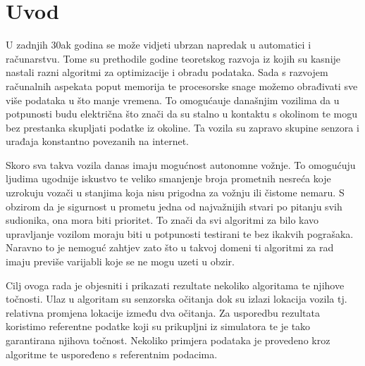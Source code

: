 \chapter{Uvod}

U zadnjih 30ak godina se može vidjeti ubrzan napredak u automatici i računarstvu. Tome su prethodile godine teoretskog razvoja iz kojih su kasnije nastali razni algoritmi za optimizacije i obradu podataka. Sada s razvojem računalnih aspekata poput memorija te procesorske snage možemo obrađivati sve više podataka u što manje vremena. To omogućauje današnjim vozilima da u potpunosti budu električna što znači da su stalno u kontaktu s okolinom te mogu bez prestanka skupljati podatke iz okoline. Ta vozila su zapravo skupine senzora i urađaja konstantno povezanih na internet.

Skoro sva takva vozila danas imaju mogućnost autonomne vožnje. To omogućuju ljudima ugodnije iskustvo te veliko smanjenje broja prometnih nesreća koje uzrokuju vozači u stanjima koja nisu prigodna za vožnju ili čistome nemaru. S obzirom da je sigurnost u prometu jedna od najvažnijih stvari po pitanju svih sudionika, ona mora biti prioritet. To znači da svi algoritmi za bilo kavo upravljanje vozilom moraju biti u potpunosti testirani te bez ikakvih pograšaka. Naravno to je nemoguć zahtjev zato što u takvoj domeni ti algoritmi za rad imaju previše varijabli koje se ne mogu uzeti u obzir. 

Cilj ovoga rada je objesniti i prikazati rezultate nekoliko algoritama te njihove točnosti. Ulaz u algoritam su senzorska očitanja dok su izlazi lokacija vozila tj. relativna promjena lokacije između dva očitanja. Za usporedbu rezultata koristimo referentne podatke koji su prikupljni iz simulatora te je tako garantirana njihova točnost. Nekoliko primjera podataka je provedeno kroz algoritme te uspoređeno s referentnim podacima.
